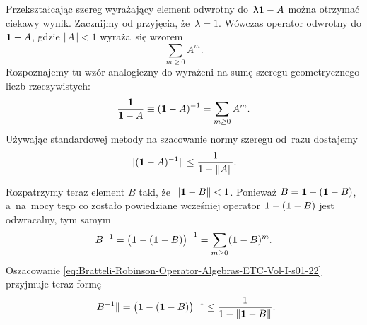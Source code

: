 \documentclass[a4paper,11pt]{article}
\begin{document}
\vspace{\VerSpaceFour}





\noindent
{} Przekształcając szereg wyrażający element odwrotny
do~$\uplambda \mathbf{1} - A$ można otrzymać ciekawy wynik. Zacznijmy od przyjęcia,
że~$\lambda = 1$. Wówczas operator odwrotny do $\mathbf{1} - A$, gdzie $\Vert A \Vert < 1$
wyraża~się wzorem
\begin{equation}
  \label{eq:Bratteli-Robinson-Operator-Algebras-ETC-Vol-I-s01-20}
  \sum_{ m \geq 0 } A^{ m }.
\end{equation}
Rozpoznajemy tu wzór analogiczny do wyrażeni na sumę szeregu geometrycznego
liczb rzeczywistych:
\begin{equation}
  \label{eq:Bratteli-Robinson-Operator-Algebras-ETC-Vol-I-s01-21}
  \frac{ \mathbf{1} }{ \mathbf{1} - A } \equiv ( \mathbf{1} - A )^{ -1 } =
  \sum_{ m \geq 0 } A^{ m }.
\end{equation}
Używając standardowej metody na szacowanie normy szeregu od~razu dostajemy
\begin{equation}
  \label{eq:Bratteli-Robinson-Operator-Algebras-ETC-Vol-I-s01-22}
  \Vert ( \mathbf{1} - A )^{ -1 } \Vert \leq
  \frac{ 1 }{ 1 - \Vert A \Vert }.
\end{equation}

Rozpatrzymy teraz element $B$ taki, że~$\Vert \mathbf{1} - B \Vert < 1$. Ponieważ
$B = \mathbf{1} - ( \mathbf{1} - B )$, a~na~mocy tego co zostało
powiedziane wcześniej operator $\mathbf{1} - ( \mathbf{1} - B )$ jest
odwracalny, tym samym
\begin{equation}
  \label{eq:Bratteli-Robinson-Operator-Algebras-ETC-Vol-I-s01-23}
  B^{ -1 } =
  \big( \mathbf{1} - ( \mathbf{1} - B ) \big)^{ -1 } =
  \sum_{ m \geq 0 } ( \mathbf{1} - B )^{ m }.
\end{equation}
Oszacowanie \eqref{eq:Bratteli-Robinson-Operator-Algebras-ETC-Vol-I-s01-22}
przyjmuje teraz formę
\begin{equation}
  \label{eq:Bratteli-Robinson-Operator-Algebras-ETC-Vol-I-s01-24}
  \Vert B^{ -1 } \Vert =
  \big( \mathbf{1} - ( \mathbf{1} - B ) \big)^{ -1 } \leq
  \frac{ 1 }{ 1 - \Vert \mathbf{1} - B \Vert }.
\end{equation}

\vspace{\VerSpaceFour}
\end{document}

